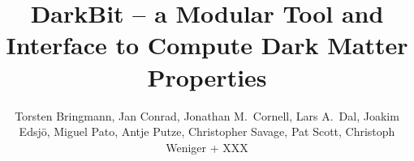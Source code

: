 %
%
%
%
%
%
\RequirePackage{fix-cm}
%
\documentclass[twocolumn,epjc3]{svjour3}  
%
\smartqed  %
%
\RequirePackage{graphicx}
\RequirePackage{color}
%
%
\RequirePackage{latexsym}
%
%
%


\title{DarkBit -- a Modular Tool and Interface to Compute Dark Matter Properties%
}


\author{Torsten Bringmann, Jan Conrad, Jonathan M.~Cornell, Lars A.~Dal, Joakim Edsj\"o, Miguel Pato, Antje Putze, Christopher Savage, Pat Scott, Christoph Weniger + XXX
}




